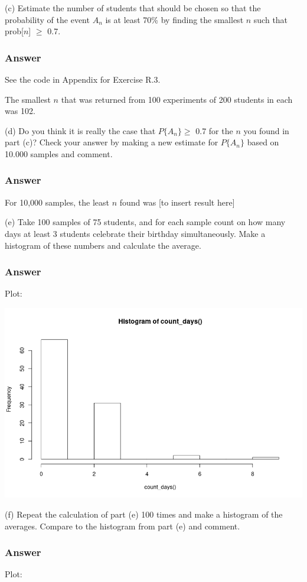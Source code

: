 \documentclass[12pt]{article}
\begin{document}
(c) Estimate the number of students that should be chosen so that the probability of the event $A_{n}$ is at least 70\% by finding the smallest $n$ such that prob[$n$] $\geq$ 0.7.\\
\subsubsection*{Answer}
See the code in Appendix for Exercise R.3.

The smallest $n$ that was returned from 100 experiments of 200 students in each was 102.

(d) Do you think it is really the case that $P\{A_{n}\} \geq$ 0.7 for the $n$ you found in part (c)? Check your answer by making a new estimate for $P\{A_{n}\}$ based on 10.000 samples and comment.
\subsubsection*{Answer}
For 10,000 samples, the least $n$ found was [to insert result here]

(e) Take 100 samples of 75 students, and for each sample count on how many days at least 3 students celebrate their birthday simultaneously. Make a histogram of these numbers and calculate the average.
\subsubsection*{Answer}
Plot:

\includegraphics[width=\textwidth]{Ex3Plot2}

(f) Repeat the calculation of part (e) 100 times and make a histogram of the averages. Compare to the histogram from part (e) and comment.
\subsubsection*{Answer}
Plot:
\end{document}
